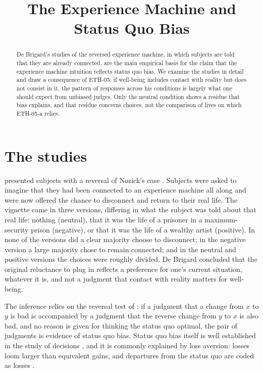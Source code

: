 \documentclass{situationist-preprint}
\title{The Experience Machine and Status Quo Bias}
\begin{document}
\maketitle

\begin{abstract}
De Brigard's studies of the reversed experience machine, in which subjects are told that they are already connected, are the main empirical basis for the claim that the experience machine intuition reflects status quo bias. We examine the studies in detail and draw a consequence of ETH-05: if well-being includes contact with reality but does not consist in it, the pattern of responses across his conditions is largely what one should expect from unbiased judges. Only the neutral condition shows a residue that bias explains, and that residue concerns choices, not the comparison of lives on which ETH-05-a relies.
\end{abstract}

\section{The studies}

\citet{deBrigard2010} presented subjects with a reversal of Nozick's case \citep{Nozick1974}. Subjects were asked to imagine that they had been connected to an experience machine all along and were now offered the chance to disconnect and return to their real life. The vignette came in three versions, differing in what the subject was told about that real life: nothing (neutral), that it was the life of a prisoner in a maximum-security prison (negative), or that it was the life of a wealthy artist (positive). In none of the versions did a clear majority choose to disconnect; in the negative version a large majority chose to remain connected; and in the neutral and positive versions the choices were roughly divided. De Brigard concluded that the original reluctance to plug in reflects a preference for one's current situation, whatever it is, and not a judgment that contact with reality matters for well-being.

The inference relies on the reversal test of \citet{BostromOrd2006}: if a judgment that a change from $x$ to $y$ is bad is accompanied by a judgment that the reverse change from $y$ to $x$ is also bad, and no reason is given for thinking the status quo optimal, the pair of judgments is evidence of status quo bias. Status quo bias itself is well established in the study of decisions \citep{SamuelsonZeckhauser1988}, and it is commonly explained by loss aversion: losses loom larger than equivalent gains, and departures from the status quo are coded as losses \citep{Kahneman1991}.
\end{document}
